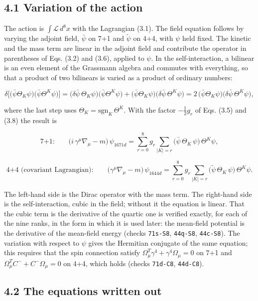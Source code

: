 \documentclass[
  10pt,
]{article}
\begin{document}
\hypertarget{variation-of-the-action}{%
\subsection{4.1 Variation of the action}\label{variation-of-the-action}}

The action is \(\int\mathcal L\,d^8x\) with the Lagrangian (3.1). The
field equation follows by varying the adjoint field, \(\bar\psi\) on 7+1
and \(\tilde\psi\) on 4+4, with \(\psi\) held fixed. The kinetic and the
mass term are linear in the adjoint field and contribute the operator in
parentheses of Eqs. (3.2) and (3.6), applied to \(\psi\). In the
self-interaction, a bilinear is an even element of the Grassmann algebra
and commutes with everything, so that a product of two bilinears is
varied as a product of ordinary numbers:

\[\delta\Big[\big(\bar\psi\Theta_K\psi\big)\big(\bar\psi\Theta^K\psi\big)\Big]
=\big(\delta\bar\psi\,\Theta_K\psi\big)\big(\bar\psi\Theta^K\psi\big)+\big(\bar\psi\Theta_K\psi\big)\big(\delta\bar\psi\,\Theta^K\psi\big)
=2\,\big(\bar\psi\Theta_K\psi\big)\big(\delta\bar\psi\,\Theta^K\psi\big),\]

where the last step uses \(\Theta_K=\mathrm{sgn}_K\,\Theta^K\). With the
factor \(-\tfrac12g_r\) of Eqs. (3.5) and (3.8) the result is

\[\text{7+1:}\qquad\big(i\,\gamma^\mu\nabla_\mu-m\big)\,\psi_{1671d}
=\sum_{r=0}^{8}g_r\sum_{|K|=r}\big(\bar\psi\,\Theta_K\,\psi\big)\,\Theta^K\psi,\tag{4.1}\]

\[\text{4+4 (covariant Lagrangian):}\qquad\big(\gamma^\mu\nabla_\mu-m\big)\,\psi_{1644d}
=\sum_{r=0}^{8}g_r\sum_{|K|=r}\big(\tilde\psi\,\Theta_K\,\psi\big)\,\Theta^K\psi.\tag{4.2}\]

The left-hand side is the Dirac operator with the mass term. The
right-hand side is the self-interaction, cubic in the field; without it
the equation is linear. That the cubic term is the derivative of the
quartic one is verified exactly, for each of the nine ranks, in the form
in which it is used later: the mean-field potential is the derivative of
the mean-field energy (checks \texttt{71s-S8}, \texttt{44q-S8},
\texttt{44c-S8}). The variation with respect to \(\psi\) gives the
Hermitian conjugate of the same equation; this requires that the spin
connection satisfy \(\Omega_\mu^T\gamma^4+\gamma^4\Omega_\mu=0\) on 7+1
and \(\Omega_\mu^TC^-+C^-\Omega_\mu=0\) on 4+4, which holds (checks
\texttt{71d-C8}, \texttt{44d-C8}).

\hypertarget{the-equations-written-out}{%
\subsection{4.2 The equations written
out}\label{the-equations-written-out}}
\end{document}
